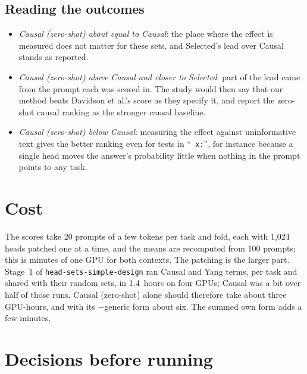 \documentclass[10pt,a4paper]{article}
\newcommand{\p}[1]{``\texttt{#1}''}
\newcommand{\simpledoc}{\texttt{head-sets-simple-design}}
\begin{document}
\subsection{Reading the outcomes}\label{sec:outcomes}

\begin{itemize}
\item \emph{Causal (zero-shot) about equal to Causal}: the place where the effect is measured does not matter for these sets, and Selected's lead over Causal stands as reported.
\item \emph{Causal (zero-shot) above Causal and closer to Selected}: part of the lead came from the prompt each was scored in. The study would then say that our method beats Davidson et al.'s score as they specify it, and report the zero-shot causal ranking as the stronger causal baseline.
\item \emph{Causal (zero-shot) below Causal}: measuring the effect against uninformative text gives the better ranking even for tests in \p{ x:}, for instance because a single head moves the answer's probability little when nothing in the prompt points to any task.
\end{itemize}

\section{Cost}\label{sec:cost}

The scores take 20 prompts of a few tokens per task and fold, each with 1{,}024 heads patched one at a time, and the means are recomputed from 100 prompts; this is minutes of one GPU for both contexts. The patching is the larger part. Stage~1 of \simpledoc{} ran Causal and Yang terms, per task and shared with their random sets, in 1.4~hours on four GPUs; Causal was a bit over half of those runs. Causal (zero-shot) alone should therefore take about three GPU-hours, and with its $-$generic form about six. The summed own form adds a few minutes.

\section{Decisions before running}\label{sec:decisions}
\end{document}
